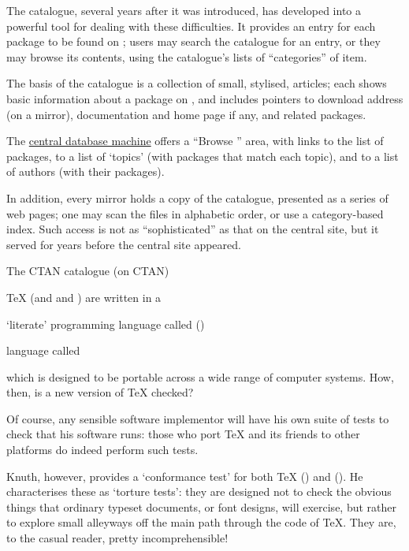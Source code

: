 The  catalogue, several years after it was introduced, has
developed into a powerful tool for dealing with these difficulties.
It provides an entry for each package to be found on ;
users may search the catalogue for an entry, or they may browse its
contents, using the catalogue's lists of ``categories'' of item.

The basis of the catalogue is a collection of small, stylised,
articles; each shows basic information about a package on ,
and includes pointers to download address (on a  mirror),
documentation and home page if any, and related packages.

The \href{http://www.ctan.org}{ central database machine}
offers a ``Browse '' area, with links to the list of
packages, to a list of `topics' (with packages that match each topic),
and to a list of authors (with their packages).

In addition, every  mirror holds a copy of the catalogue,
presented as a series of web pages; one may scan the files in
alphabetic order, or use a category-based index.  Such access is not
as ``sophisticated'' as that on the central site, but it served for
years before the central site appeared.
\begin{ctanrefs}
\item[\nothtml{\rmfamily}The CTAN catalogue (on CTAN)]
\end{ctanrefs}


\TeX{} (and \MF{} and \MP{}) are written in a
\begin{flatversion} %
  `literate' programming language called  ()
\end{flatversion}
\begin{hyperversion}
   language called 
\end{hyperversion}
which is designed to be portable across a wide range of computer
systems.  How, then, is a new version of \TeX{} checked?

Of course, any sensible software implementor will have his own suite
of tests to check that his software runs: those who port \TeX{} and
its friends to other platforms do indeed perform such tests.

Knuth, however, provides a `conformance test' for both \TeX{}
() and \MF{} ().
He characterises these as `torture tests': they are designed not to
check the obvious things that ordinary typeset documents, or font
designs, will exercise, but rather to explore small alleyways off the
main path through the code of \TeX{}.  They are, to the casual reader,
pretty incomprehensible!

